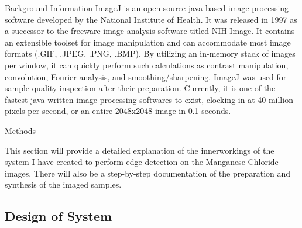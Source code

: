 \documentclass[a4paper,12pt]{article}
\begin{document}
\begin{section}{Background Information}
ImageJ is an open-source java-based image-processing software developed by the National Institute of Health. It was released in 1997 as a successor to the freeware image analysis software titled NIH Image. It contains an extensible toolset for image manipulation and can accommodate most image formats (.GIF, .JPEG, .PNG, .BMP). By utilizing an in-memory stack of images per window, it can quickly perform such calculations as contrast manipulation, convolution, Fourier analysis, and smoothing/sharpening. ImageJ was used for sample-quality inspection after their preparation. Currently, it is one of the fastest java-written image-processing softwares to exist, clocking in at 40 million pixels per second, or an entire 2048x2048 image in 0.1 seconds.

\end{section}

\begin{section}{Methods}

This section will provide a detailed explanation of the innerworkings of the system I have created to perform edge-detection on the Manganese Chloride images. There will also be a step-by-step documentation of the preparation and synthesis of the imaged samples.


\subsection{Design of System}


\end{section}
\end{document}

